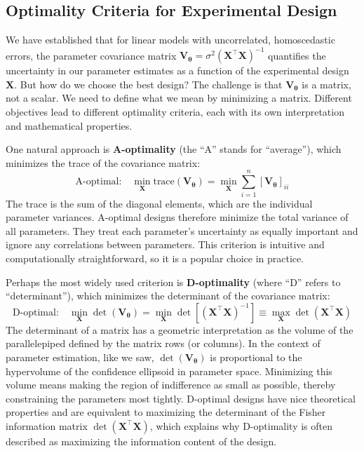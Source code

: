 \subsection{Optimality Criteria for Experimental Design}

We have established that for linear models with uncorrelated, homoscedastic errors, the parameter covariance matrix $\mathbf{V}_{\boldsymbol{\theta}} = \sigma^2 (\mathbf{X}^\top \mathbf{X})^{-1}$ quantifies the uncertainty in our parameter estimates as a function of the experimental design $\mathbf{X}$. But how do we choose the best design? The challenge is that $\mathbf{V}_{\boldsymbol{\theta}}$ is a matrix, not a scalar. We need to define what we mean by minimizing a matrix. Different objectives lead to different optimality criteria, each with its own interpretation and mathematical properties.

One natural approach is \textbf{A-optimality} (the ``A'' stands for ``average''), which minimizes the trace of the covariance matrix:
\begin{equation}
    \text{A-optimal:} \quad \min_{\mathbf{X}} \text{trace}(\mathbf{V}_{\boldsymbol{\theta}}) = \min_{\mathbf{X}} \sum_{i=1}^{n} [\mathbf{V}_{\boldsymbol{\theta}}]_{ii}
\end{equation}
The trace is the sum of the diagonal elements, which are the individual parameter variances. A-optimal designs therefore minimize the total variance of all parameters. They treat each parameter's uncertainty as equally important and ignore any correlations between parameters. This criterion is intuitive and computationally straightforward, so it is a popular choice in practice.

Perhaps the most widely used criterion is \textbf{D-optimality} (where ``D'' refers to ``determinant''), which minimizes the determinant of the covariance matrix:
\begin{equation}
    \text{D-optimal:} \quad \min_{\mathbf{X}} \det(\mathbf{V}_{\boldsymbol{\theta}}) = \min_{\mathbf{X}} \det\left[\left(\mathbf{X}^\top \mathbf{X}\right)^{-1}\right] \equiv \max_{\mathbf{X}} \det\left(\mathbf{X}^\top \mathbf{X}\right)
\end{equation}
The determinant of a matrix has a geometric interpretation as the volume of the parallelepiped defined by the matrix rows (or columns). In the context of parameter estimation, like we saw, $\det(\mathbf{V}_{\boldsymbol{\theta}})$ is proportional to the hypervolume of the confidence ellipsoid in parameter space. Minimizing this volume means making the region of indifference as small as possible, thereby constraining the parameters most tightly. D-optimal designs have nice theoretical properties and are equivalent to maximizing the determinant of the Fisher information matrix $\det(\mathbf{X}^\top \mathbf{X})$, which explains why D-optimality is often described as maximizing the information content of the design.

